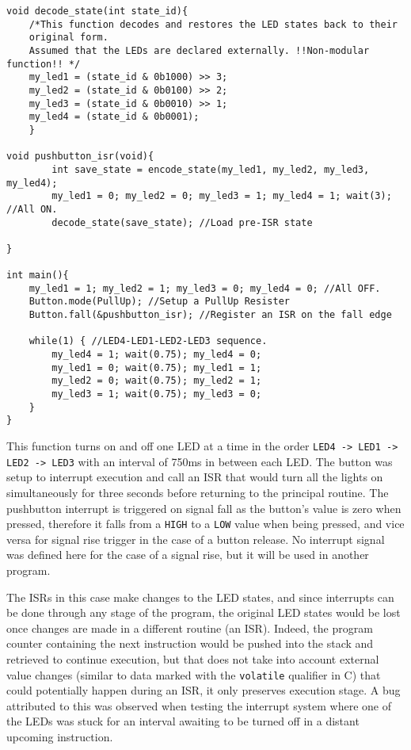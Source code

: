 \documentclass{article}
\begin{document}
\begin{verbatim}
void decode_state(int state_id){
    /*This function decodes and restores the LED states back to their
    original form.
    Assumed that the LEDs are declared externally. !!Non-modular function!! */
    my_led1 = (state_id & 0b1000) >> 3;
    my_led2 = (state_id & 0b0100) >> 2;
    my_led3 = (state_id & 0b0010) >> 1;
    my_led4 = (state_id & 0b0001);
    }

void pushbutton_isr(void){
        int save_state = encode_state(my_led1, my_led2, my_led3, my_led4);
        my_led1 = 0; my_led2 = 0; my_led3 = 1; my_led4 = 1; wait(3); //All ON.
        decode_state(save_state); //Load pre-ISR state
        
}

int main(){
    my_led1 = 1; my_led2 = 1; my_led3 = 0; my_led4 = 0; //All OFF.
    Button.mode(PullUp); //Setup a PullUp Resister
    Button.fall(&pushbutton_isr); //Register an ISR on the fall edge
    
    while(1) { //LED4-LED1-LED2-LED3 sequence.
        my_led4 = 1; wait(0.75); my_led4 = 0;
        my_led1 = 0; wait(0.75); my_led1 = 1;
        my_led2 = 0; wait(0.75); my_led2 = 1;
        my_led3 = 1; wait(0.75); my_led3 = 0;     
    }
}
\end{verbatim}
\pagebreak

This function turns on and off one LED at a time in the order \texttt{LED4 -> LED1 -> LED2 -> LED3} with an interval of 750ms in between each LED. The button was setup to interrupt execution and call an ISR that would turn all the lights on simultaneously for three seconds before returning to the principal routine. The pushbutton interrupt is triggered on signal fall as the button's value is zero when pressed, therefore it falls from a \texttt{HIGH} to a \texttt{LOW} value when being pressed, and vice versa for signal rise trigger in the case of a button release. No interrupt signal was defined here for the case of a signal rise, but it will be used in another program.

The ISRs in this case make changes to the LED states, and since interrupts can be done through any stage of the program, the original LED states would be lost once changes are made in a different routine (an ISR). Indeed, the program counter containing the next instruction would be pushed into the stack and retrieved to continue execution, but that does not take into account external value changes (similar to data marked with the \texttt{volatile} qualifier in C) that could potentially happen during an ISR, it only preserves execution stage. A bug attributed to this was observed when testing the interrupt system where one of the LEDs was stuck for an interval awaiting to be turned off in a distant upcoming instruction.
\end{document}
